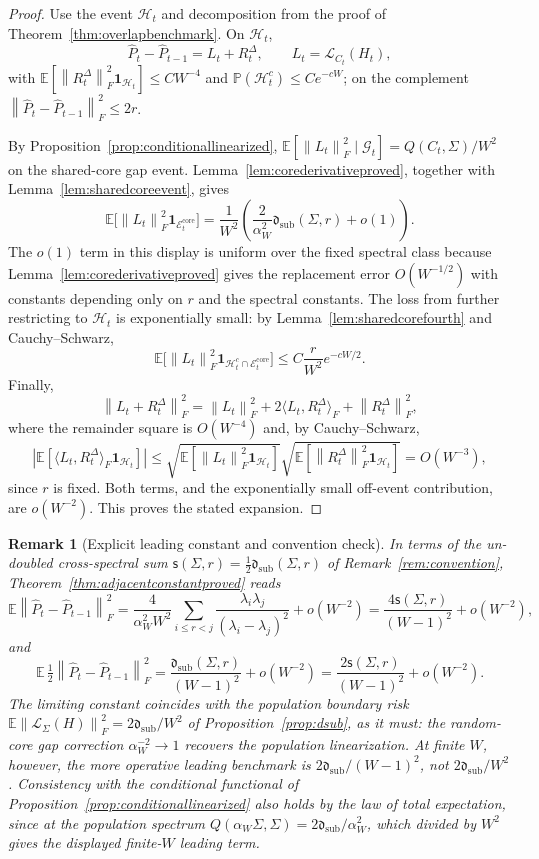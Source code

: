 \documentclass[11pt]{article}
\theoremstyle{tightplain}
\theoremstyle{tightdef}
\newtheorem{remark}[theorem]{Remark}
\newcommand{\E}{\mathbb E}
\newcommand{\Prob}{\mathbb P}
\newcommand{\norm}[1]{\left\lVert #1 \right\rVert}
\newcommand{\abs}[1]{\left\lvert #1 \right\rvert}
\newcommand{\one}{\mathbf 1}
\newcommand{\dsub}{\mathfrak d_{\mathrm{sub}}}
\newcommand{\ssum}{\mathsf s}
\begin{document}
\begin{proof}
Use the event $\mathcal H_t$ and decomposition from the proof of
Theorem~\ref{thm:overlapbenchmark}. On $\mathcal H_t$,
\[
\widehat P_t-\widehat P_{t-1}
=L_t+R_t^\Delta,
\qquad
L_t=\mathcal L_{C_t}(H_t),
\]
with $\E[\norm{R_t^\Delta}_F^2\one_{\mathcal H_t}]\le C W^{-4}$ and
$\Prob(\mathcal H_t^c)\le Ce^{-cW}$; on the complement
$\norm{\widehat P_t-\widehat P_{t-1}}_F^2\le 2r$.

By Proposition~\ref{prop:conditionallinearized},
$\E[\norm{L_t}_F^2\mid\mathcal G_t]=Q(C_t,\Sigma)/W^2$ on the shared-core gap
event. Lemma~\ref{lem:corederivativeproved}, together with
Lemma~\ref{lem:sharedcoreevent}, gives
\[
\E\bigl[\norm{L_t}_F^2\one_{\mathcal E_t^{\mathrm{core}}}\bigr]
=\frac{1}{W^2}
\left(
\frac{2}{\alpha_W^2}\dsub(\Sigma,r)
+
o(1)
\right).
\]
The $o(1)$ term in this display is uniform over the fixed spectral class because
Lemma~\ref{lem:corederivativeproved} gives the replacement error
$O(W^{-1/2})$ with constants depending only on $r$ and the spectral constants.
The loss from further restricting to $\mathcal H_t$ is exponentially small: by
Lemma~\ref{lem:sharedcorefourth} and Cauchy--Schwarz,
\[
\E\bigl[\norm{L_t}_F^2\one_{\mathcal H_t^c\cap\mathcal E_t^{\mathrm{core}}}\bigr]
\le
C\frac r{W^2}e^{-cW/2}.
\]
Finally,
\[
\norm{L_t+R_t^\Delta}_F^2
=\norm{L_t}_F^2
+
2\langle L_t,R_t^\Delta\rangle_F
+
\norm{R_t^\Delta}_F^2,
\]
where the remainder square is $O(W^{-4})$ and, by Cauchy--Schwarz,
\[
\abs{\E[\langle L_t,R_t^\Delta\rangle_F\one_{\mathcal H_t}]}
\le
\sqrt{\E[\norm{L_t}_F^2\one_{\mathcal H_t}]}
\sqrt{\E[\norm{R_t^\Delta}_F^2\one_{\mathcal H_t}]}
=O(W^{-3}),
\]
since $r$ is fixed. Both terms, and the exponentially small off-event
contribution, are $o(W^{-2})$. This proves the stated expansion.
\end{proof}

\begin{remark}[Explicit leading constant and convention check]\label{rem:explicit}
In terms of the un-doubled cross-spectral sum
$\ssum(\Sigma,r)=\tfrac12\dsub(\Sigma,r)$ of
Remark~\ref{rem:convention}, Theorem~\ref{thm:adjacentconstantproved} reads
\[
\E\norm{\widehat P_t-\widehat P_{t-1}}_F^2
=\frac{4}{\alpha_W^2 W^2}\sum_{i\le r<j}
\frac{\lambda_i\lambda_j}{(\lambda_i-\lambda_j)^2}
+o(W^{-2})
=\frac{4\ssum(\Sigma,r)}{(W-1)^2}+o(W^{-2}),
\]
and
\[
\E\,\tfrac12\norm{\widehat P_t-\widehat P_{t-1}}_F^2
=\frac{\dsub(\Sigma,r)}{(W-1)^2}+o(W^{-2})
=\frac{2\ssum(\Sigma,r)}{(W-1)^2}+o(W^{-2}).
\]
The limiting constant coincides with the population boundary risk
$\E\norm{\mathcal L_\Sigma(H)}_F^2=2\mathfrak d_{\mathrm{sub}}/W^2$ of
Proposition~\ref{prop:dsub}, as it must: the random-core gap correction
$\alpha_W^{-2}\to1$ recovers the population linearization. At finite $W$,
however, the more operative leading benchmark is
$2\mathfrak d_{\mathrm{sub}}/(W-1)^2$, not
$2\mathfrak d_{\mathrm{sub}}/W^2$. Consistency with the conditional functional
of Proposition~\ref{prop:conditionallinearized} also holds by the law of total
expectation, since at the population spectrum
$Q(\alpha_W\Sigma,\Sigma)=2\mathfrak d_{\mathrm{sub}}/\alpha_W^2$, which divided
by $W^2$ gives the displayed finite-$W$ leading term.
\end{remark}
\end{document}
